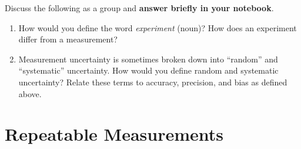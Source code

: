 \documentclass[12pt]{article}%
\begin{document}
Discuss the following as a group and \textbf{answer briefly in your notebook}.

\begin{enumerate}

\item How would you define the word \textit{experiment} (noun)? How does an
experiment differ from a measurement?
\item Measurement uncertainty is sometimes broken down into ``random'' and ``systematic'' uncertainty. How would you define random and systematic uncertainty? Relate these terms to accuracy, precision, and bias as defined above.
\end{enumerate}

\section{Repeatable Measurements}

%
%
%
%
%
%
\end{document}
